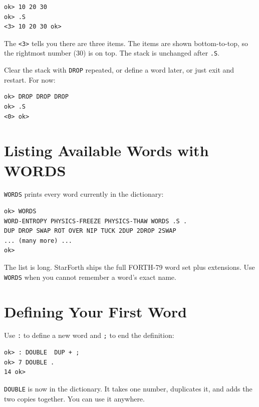 \begin{lstlisting}[language=Forth]
ok> 10 20 30
ok> .S
<3> 10 20 30 ok>
\end{lstlisting}

The \texttt{<3>} tells you there are three items. The items are shown
bottom-to-top, so the rightmost number (30) is on top. The stack is
unchanged after \texttt{.S}.

Clear the stack with \texttt{DROP} repeated, or define a word later, or just
exit and restart. For now:

\begin{lstlisting}[language=Forth]
ok> DROP DROP DROP
ok> .S
<0> ok>
\end{lstlisting}

\section{Listing Available Words with WORDS}
\label{sec:words}

\texttt{WORDS} prints every word currently in the dictionary:

\begin{lstlisting}[language=Forth]
ok> WORDS
WORD-ENTROPY PHYSICS-FREEZE PHYSICS-THAW WORDS .S .
DUP DROP SWAP ROT OVER NIP TUCK 2DUP 2DROP 2SWAP
... (many more) ...
ok>
\end{lstlisting}

The list is long. StarForth ships the full FORTH-79 word set plus
extensions. Use \texttt{WORDS} when you cannot remember a word's exact name.

\section{Defining Your First Word}
\label{sec:first-definition}

Use \texttt{:} to define a new word and \texttt{;} to end the definition:

\begin{lstlisting}[language=Forth]
ok> : DOUBLE  DUP + ;
ok> 7 DOUBLE .
14 ok>
\end{lstlisting}

\texttt{DOUBLE} is now in the dictionary. It takes one number, duplicates it,
and adds the two copies together. You can use it anywhere.

